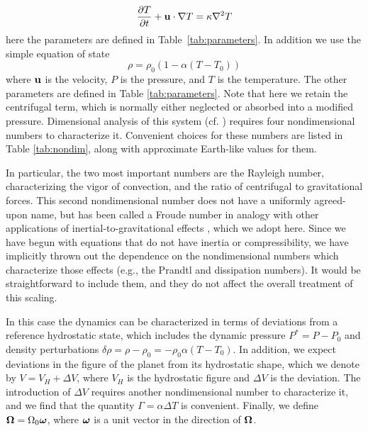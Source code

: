 \documentclass[extra,mreferee]{gji}
\begin{document}
\begin{equation}
\frac{\partial T}{\partial t} + {\bf u} \cdot \nabla T = \kappa \nabla^2 T
\label{eq:energy}
\end{equation}
here the parameters are defined in Table~\ref{tab:parameters}.
In addition we use the simple equation of state
\begin{equation}
\rho = \rho_0 \left( 1 - \alpha (T-T_0) \right)
\label{eq:eos}
\end{equation}
where $\bf u$ is the velocity, $P$ is the pressure, and $T$ is the temperature.
The other parameters are defined in Table \ref{tab:parameters}.
Note that here we retain the centrifugal term, which is normally either neglected or absorbed into a modified pressure.
Dimensional analysis of this system (cf. \citet{barenblatt1996scaling}) requires four nondimensional numbers to characterize it.
Convenient choices for these numbers are listed in Table \ref{tab:nondim}, along with approximate Earth-like values for them.

In particular, the two most important numbers are the Rayleigh number, characterizing the vigor of convection, and the ratio of centrifugal to gravitational forces.
This second nondimensional number does not have a uniformly agreed-upon name, but has been called a Froude number in analogy with other applications of inertial-to-gravitational effects \citep{mckenzie1968influence}, which we adopt here.
Since we have begun with equations that do not have inertia or compressibility, we have implicitly thrown out the dependence on the nondimensional numbers which characterize those effects (e.g., the Prandtl and dissipation numbers).
It would be straightforward to include them, and they do not affect the overall treatment of this scaling.

In this case the dynamics can be characterized in terms of deviations from a reference hydrostatic state, which includes the dynamic pressure $P^* = P - P_0$ and density perturbations $\delta \rho = \rho- \rho_0 = - \rho_0 \alpha (T-T_0)$.
In addition, we expect deviations in the figure of the planet from its hydrostatic shape, which we denote by $V = V_H + \Delta V$, where $V_H$ is the hydrostatic figure and $\Delta V$ is the deviation.
The introduction of $\Delta V$ requires another nondimensional number to characterize it, and we find that the quantity $\Gamma = \alpha \Delta T$ is convenient.
Finally, we define $\mitbf{\Omega} = \Omega_0 \mitbf{\omega}$, where $\mitbf{\omega}$ is a unit vector in the direction of $\mitbf{\Omega}$.
\end{document}
